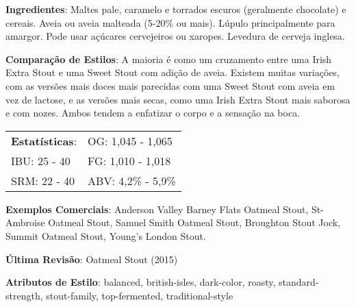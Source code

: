\textbf{Ingredientes}: Maltes pale, caramelo e torrados escuros (geralmente chocolate) e cereais. Aveia ou aveia malteada (5-20\% ou mais). Lúpulo principalmente para amargor. Pode usar açúcares cervejeiros ou xaropes. Levedura de cerveja inglesa.

\textbf{Comparação de Estilos}: A maioria é como um cruzamento entre uma Irish Extra Stout e uma Sweet Stout com adição de aveia. Existem muitas variações, com as versões mais doces mais parecidas com uma Sweet Stout com aveia em vez de lactose, e as versões mais secas, como uma Irish Extra Stout mais saborosa e com nozes. Ambos tendem a enfatizar o corpo e a sensação na boca.

\begin{tabular}{@{}p{35mm}p{35mm}@{}}
  \textbf{Estatísticas}: & OG: 1,045 - 1,065 \\
  IBU: 25 - 40  & FG: 1,010 - 1,018 \\
  SRM: 22 - 40  & ABV: 4,2\% - 5,9\%
\end{tabular}

\textbf{Exemplos Comerciais}: Anderson Valley Barney Flats Oatmeal Stout, St-Ambroise Oatmeal Stout, Samuel Smith Oatmeal Stout, Broughton Stout Jock, Summit Oatmeal Stout, Young's London Stout.

\textbf{Última Revisão}: Oatmeal Stout (2015)

\textbf{Atributos de Estilo}: balanced, british-isles, dark-color, roasty, standard-strength, stout-family, top-fermented, traditional-style
